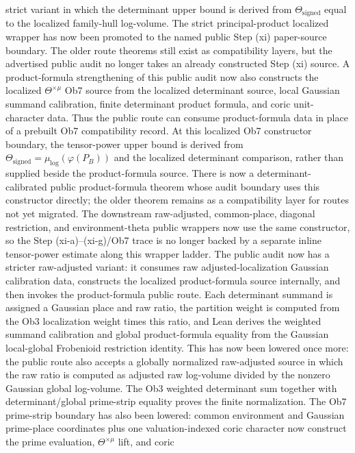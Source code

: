 \documentclass[11pt]{article}
\theoremstyle{plain}
\theoremstyle{definition}
\theoremstyle{remark}
\begin{document}
strict variant in which the determinant upper bound is derived from
\(\Theta_{\mathrm{signed}}\) equal to the localized family-hull log-volume.
The strict principal-product localized wrapper has now been promoted to the
named public Step (xi) paper-source boundary.  The older route theorems still
exist as compatibility layers, but the advertised public audit no longer takes
an already constructed Step (xi) source.  A product-formula strengthening of
this public audit now also constructs the localized \(\Theta^{\times\mu}\)
Ob7 source from the localized determinant source, local Gaussian summand
calibration, finite determinant product formula, and coric unit-character
data.  Thus the public route can consume product-formula data in place of a
prebuilt Ob7 compatibility record.  At this localized Ob7 constructor
boundary, the tensor-power upper bound is derived from
\(\Theta_{\mathrm{signed}}=\mu_{\log}(\varphi(P_B))\) and the localized
determinant comparison, rather than supplied beside the product-formula source.
There is now a determinant-calibrated public product-formula theorem whose
audit boundary uses this constructor directly; the older theorem remains as a
compatibility layer for routes not yet migrated.  The downstream
raw-adjusted, common-place, diagonal restriction, and environment-theta public
wrappers now use the same constructor, so the Step (xi-a)--(xi-g)/Ob7 trace is
no longer backed by a separate inline tensor-power estimate along this wrapper
ladder.
The public audit now has a stricter
raw-adjusted variant: it consumes raw adjusted-localization Gaussian
calibration data, constructs the localized product-formula source internally,
and then invokes the product-formula public route.  Each determinant summand is
assigned a Gaussian place and raw ratio, the partition weight is computed from
the Ob3 localization weight times this ratio, and Lean derives the weighted
summand calibration and global product-formula equality from the Gaussian
local-global Frobenioid restriction identity.  This has now been lowered once
more: the public route also accepts a globally normalized raw-adjusted source
in which the raw ratio is computed as adjusted raw log-volume divided by the
nonzero Gaussian global log-volume.  The Ob3 weighted determinant sum together
with determinant/global prime-strip equality proves the finite normalization.
The Ob7 prime-strip boundary has also been lowered: common environment and
Gaussian prime-place coordinates plus one valuation-indexed coric character now
construct the prime evaluation, \(\Theta^{\times\mu}\) lift, and coric
\end{document}
